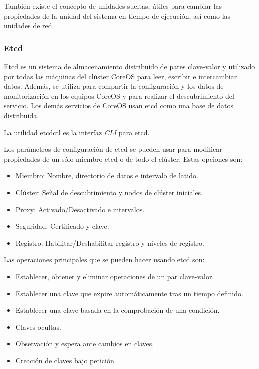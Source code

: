 También existe el concepto de unidades sueltas, útiles para cambiar las propiedades de la unidad del sistema en tiempo de ejecución, así como las unidades de red.

\subsubsection{Etcd}

Etcd es un sistema de almacenamiento distribuido de pares clave-valor y utilizado por todas las máquinas del clúster CoreOS para leer, escribir e intercambiar datos. Además, se utiliza para compartir la configuración y los datos de monitorización en los equipos CoreOS y para realizar el descubrimiento del servicio. Los demás servicios de CoreOS usan etcd como una base de datos distribuida. 

La utilidad etcdctl es la interfaz \textit{CLI} para etcd.

Los parámetros de configuración de etcd se pueden usar para modificar propiedades de un sólo miembro etcd o de todo el clúster. Estas opciones son:

\begin{itemize}
\item Miembro: Nombre, directorio de datos e intervalo de latido.
\item Clúster: Señal de descubrimiento y nodos de clúster iniciales.
\item Proxy: Activado/Desactivado e intervalos.
\item Seguridad: Certificado y clave.
\item Registro: Habilitar/Deshabilitar registro y niveles de registro.
\end{itemize}

Las operaciones principales que se pueden hacer usando etcd son:

\begin{itemize}
\item Establecer, obtener y eliminar operaciones de un par clave-valor.
\item Establecer una clave que expire automáticamente tras un tiempo definido. 
\item Establecer una clave basada en la comprobación de una condición.
\item Claves ocultas.
\item Observación y espera ante cambios en claves.
\item Creación de claves bajo petición.
\end{itemize}

